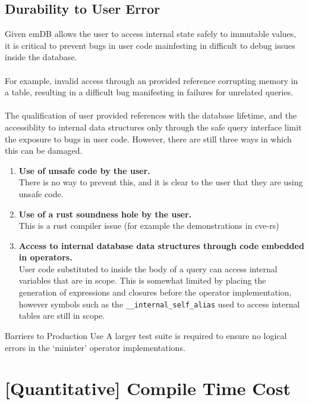 \subsection{Durability to User Error}
Given emDB allows the user to access internal state safely to immutable values, it is critical to 
prevent bugs in user code mainfesting in difficult to debug issues inside the database.
\\
\\ For example, invalid access through an \emdb provided reference corrupting memory in a table, 
resulting in a difficult bug manifesting in failures for unrelated queries.
\\
\\ The qualification of user provided references with the database lifetime, and the accessiblity to 
internal data structures only through the safe query interface limit the exposure to bugs in user code.
However, there are still three ways in which this can be damaged.
\begin{enumerate}
    \item {
        \textbf{Use of unsafe code by the user.} \\
        There is no way to prevent this, and it is clear to the user that they are using unsafe code.
    }
    \item { 
        \textbf{Use of a rust soundness hole by the user.} \\
        This is a rust compiler issue (for example the demonstrations in cve-rs\cite{CVERS})
    }
    \item { 
        \textbf{Access to internal database data structures through code embedded in operators.} \\
        User code substituted to inside the body of a query 
        can access internal variables that are in scope. This is somewhat limited by placing the generation of expressions and closures 
        before the operator implementation, however symbols such as the \texttt{__internal_self_alias} used to access internal 
        tables are still in scope.
    }
\end{enumerate}

\begin{futurebox}{Barriers to Production Use}
    A larger test suite is required to ensure no logical errors in the `minister' operator implementations.
\end{futurebox}

\section{[Quantitative] Compile Time Cost}

